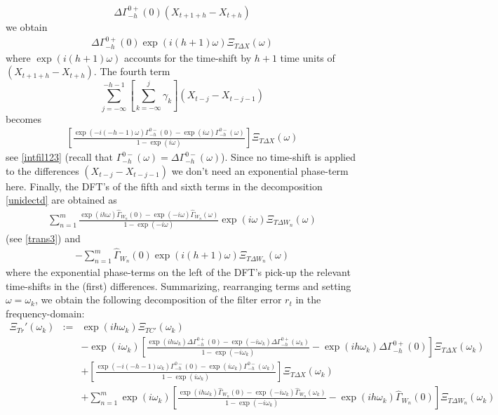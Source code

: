 \documentclass[11pt]{article}
\begin{document}
\[\Delta\Gamma_{-h}^{0+}(0)
(X_{t+1+h}-X_{t+h})\]
 we obtain 
\begin{eqnarray*}
\Delta\Gamma_{-h}^{0+}(0)\exp(i(h+1)\omega)\Xi_{T\Delta X}(\omega)
\end{eqnarray*}  
where $\exp(i(h+1)\omega)$ accounts for the time-shift by $h+1$ time units of $(X_{t+1+h}-X_{t+h})$. The fourth term
\[\sum_{j=-\infty}^{-h-1}\left[\sum_{k=-\infty}^j\gamma_k\right](X_{t-j}-X_{t-j-1})\]
becomes 
\begin{eqnarray*}
\left[\frac{\exp(-i(-h-1)\omega)\Gamma_{-h}^{0-}(0)-\exp(i\omega)\Gamma_{-h}^{0-}(\omega)}{1-\exp(i\omega)}\right]\Xi_{T\Delta X}(\omega)
\end{eqnarray*}
see \ref{intfil123} (recall that $\Gamma_{-h}^{0-}(\omega)=\Delta\Gamma_{-h}^{0-}(\omega)$). Since no time-shift is applied to the differences $(X_{t-j}-X_{t-j-1})$ we don't need an exponential phase-term here. Finally, the DFT's of the fifth and sixth terms in the decomposition \ref{unidectd} are obtained as
\begin{eqnarray*}
\sum_{n=1}^m\frac{\exp(ih\omega)\hat{\Gamma}_{W_n}(0)-\exp(-i\omega)\hat{\Gamma}_{W_n}(\omega)}{1-\exp(-i\omega)}\exp(i\omega)\Xi_{T\Delta
W_n}(\omega)
\end{eqnarray*}
(see \ref{trans3}) and
\begin{eqnarray*}
-\sum_{n=1}^m\hat{\Gamma}_{W_n}(0)\exp(i(h+1)\omega)\Xi_{T\Delta
W_n}(\omega)
\end{eqnarray*}
where the exponential phase-terms on the left of the DFT's pick-up the relevant time-shifts in the (first) differences. Summarizing, rearranging terms and setting $\omega=\omega_k$, we obtain the following  decomposition of the filter error $r_t$ in the frequency-domain:
\begin{eqnarray}
\Xi_{Tr}'(\omega_k)&:=& \exp(ih\omega_k)\Xi_{TC'}(\omega_k)\label{C'}\\
&&-\exp(i\omega_k)\left[\frac{\exp(ih\omega_k)\Delta\Gamma_{-h}^{0+}(0)-\exp(-i\omega_k)\Delta\Gamma_{-h}^{0+}(\omega_k)}{1-\exp(-i\omega_k)}-\exp(ih\omega_k)\Delta\Gamma_{-h}^{0+}(0)\right]\Xi_{T\Delta X}(\omega_k)\nonumber\\
&&+\left[\frac{\exp(-i(-h-1)\omega_k)\Gamma_{-h}^{0-}(0)-\exp(i\omega_k)\Gamma_{-h}^{0-}(\omega_k)}{1-\exp(i\omega_k)}\right]\Xi_{T\Delta X}(\omega_k)\nonumber\\
&&+\sum_{n=1}^m\exp(i\omega_k)\left[\frac{\exp(ih\omega_k)\hat{\Gamma}_{W_n}(0)-\exp(-i\omega_k)\hat{\Gamma}_{W_n}(\omega_k)}{1-\exp(-i\omega_k)}-\exp(ih\omega_k)\hat{\Gamma}_{W_n}(0)\right]\Xi_{T\Delta W_n}(\omega_k)\nonumber
\end{eqnarray} 
\end{document}
